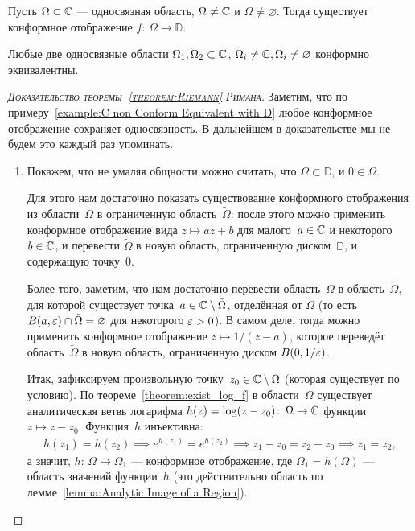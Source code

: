 \documentclass[../complex-analysis.tex]{subfiles}
\begin{document}
\begin{thm}[Римана]
 \label{theorem:Riemann}
 Пусть $ \Omega \subset \mathbb{C} $ --- односвязная область, $ \Omega \neq \mathbb{C} $ и $ \Omega \neq \varnothing $. Тогда существует конформное отображение $ f \colon\,\Omega\to\mathbb D $.
\end{thm}
\begin{crly}
 Любые две односвязные области $ \Omega_1,\Omega_2 \subset \mathbb{C} $, $ \Omega_i \neq \mathbb{C}, \Omega_i \neq \varnothing $ конформно эквивалентны.
\end{crly}
\begin{proof}[\normalfont\textsc{Доказательство теоремы~\ref{theorem:Riemann} Римана}]
 Заметим, что по примеру~\ref{example:C non Conform Equivalent with D} любое конформное отображение сохраняет односвязность. В дальнейшем в доказательстве мы не будем это каждый раз упоминать.

 \begin{enumerate}
  \item \label{enum1:proof:Riemann Thm} Покажем, что не умаляя общности можно считать, что $ \Omega \subset \mathbb D $, и $ 0 \in \Omega $.

   Для этого нам достаточно показать существование конформного отображения из области~$ \Omega $ в ограниченную область~$ \tilde\Omega $: после этого можно применить конформное отображение вида $ z \mapsto a z + b $ для малого~$ a \in \mathbb{C} $ и некоторого~$ b \in \mathbb{C} $, и перевести $ \tilde\Omega $ в новую область, ограниченную диском~$ \mathbb D $, и содержащую точку~$ 0 $.

   Более того, заметим, что нам достаточно перевести область~$ \Omega $ в область~$ \tilde\Omega $, для которой существует точка~$ a \in \mathbb{C} \setminus \tilde\Omega $, отделённая от $ \tilde\Omega $ (то есть $ B(a,\varepsilon) \cap \tilde\Omega  = \varnothing $ для некоторого $ \varepsilon > 0 $). В самом деле, тогда можно применить конформное отображение $ z \mapsto 1 / (z - a) $, которое переведёт область~$ \tilde\Omega $ в новую область, ограниченную диском $ B(0, 1 / \varepsilon) $.

   Итак, зафиксируем произвольную точку~$ z_0 \in \mathbb{C} \setminus \Omega $ (которая существует по условию). По теореме~\ref{theorem:exist_log_f} в области~$ \Omega $ существует аналитическая ветвь логарифма $ h(z) = \log (z - z_0) \colon\, \Omega \to \mathbb{C} $ функции~$ z \mapsto z - z_0 $. Функция~$ h $ инъективна:
   \begin{align*}
    h(z_1) = h(z_2) \implies e^{h(z_1)} = e^{h(z_2)} \implies z_1 - z_0 = z_2 - z_0 \implies z_1 = z_2,
   \end{align*} 
   а значит, $h \colon\,\Omega \to \Omega_1$ --- конформное отображение, где $ \Omega_1 = h(\Omega) $ --- область значений функции~$ h $ (это действительно область по лемме~\ref{lemma:Analytic Image of a Region}).


\end{enumerate}
\end{proof}
\end{document}
